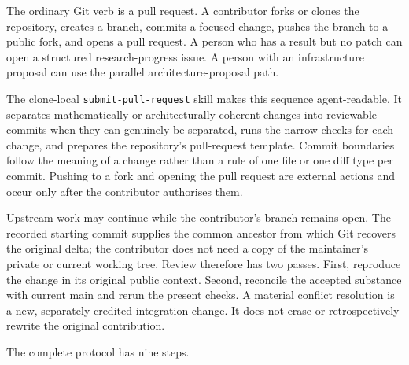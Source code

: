 \documentclass[10pt]{article}
\begin{document}
The ordinary Git verb is a pull request.  A contributor forks or clones the
repository, creates a branch, commits a focused change, pushes the branch to a
public fork, and opens a pull request.  A person who has a result but no patch
can open a structured research-progress issue.  A person with an
infrastructure proposal can use the parallel architecture-proposal path.

The clone-local \texttt{submit-pull-request} skill makes this sequence
agent-readable. It separates mathematically or architecturally coherent
changes into reviewable commits when they can genuinely be separated, runs the
narrow checks for each change, and prepares the repository's pull-request
template. Commit boundaries follow the meaning of a change rather than a rule
of one file or one diff type per commit. Pushing to a fork and opening the pull
request are external actions and occur only after the contributor authorises
them.

Upstream work may continue while the contributor's branch remains open. The
recorded starting commit supplies the common ancestor from which Git recovers
the original delta; the contributor does not need a copy of the maintainer's
private or current working tree. Review therefore has two passes. First,
reproduce the change in its original public context. Second, reconcile the
accepted substance with current main and rerun the present checks. A material
conflict resolution is a new, separately credited integration change. It does
not erase or retrospectively rewrite the original contribution.

The complete protocol has nine steps.
\end{document}
